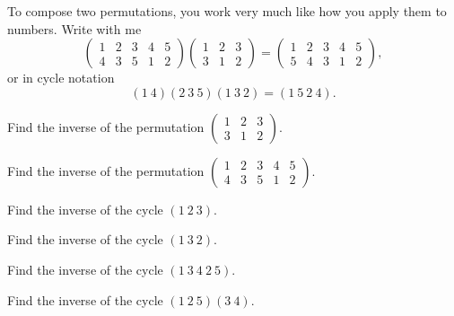 \documentclass{ximera}
\begin{document}
\begin{example}
  To compose two permutations, you work very much like how you apply
  them to numbers.  Write with me
  \[
  \left(\begin{smallmatrix}
    1 & 2 & 3 & 4 & 5\\
    4 & 3 & 5 & 1 & 2
  \end{smallmatrix}\right)
  \left(\begin{smallmatrix}
    1 & 2 & 3\\
    3 & 1 & 2
  \end{smallmatrix}\right)
  = \left(\begin{smallmatrix}
    1 & 2 & 3 & 4 & 5\\
    5 & 4 & 3 & 1 & 2
  \end{smallmatrix}\right),
  \]
  or in cycle notation
  \[
  (1\ 4)(2\ 3\ 5)(1\ 3\ 2) = (1\ 5\ 2\ 4).
  \]
\end{example}


\begin{exercise}
  Find the inverse of the permutation $\left(\begin{smallmatrix}
    1 & 2 & 3\\
    3 & 1 & 2
  \end{smallmatrix}\right)$.
\end{exercise}

\begin{exercise}
  Find the inverse of the permutation $\left(\begin{smallmatrix}
    1 & 2 & 3 & 4 & 5\\
    4 & 3 & 5 & 1 & 2
  \end{smallmatrix}\right)$.
\end{exercise}

\begin{exercise}
  Find the inverse of the cycle $(1 \ 2 \ 3 )$.
\end{exercise}

\begin{exercise}
  Find the inverse of the cycle $(1 \ 3 \ 2 )$.
\end{exercise}

\begin{exercise}
  Find the inverse of the cycle $(1\ 3\ 4 \ 2 \ 5 )$.
\end{exercise}


\begin{exercise}
  Find the inverse of the cycle $(1 \ 2 \ 5) (3\ 4)$.
\end{exercise}
\end{document}
